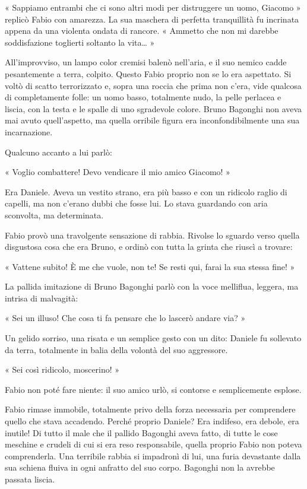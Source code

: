 « Sappiamo entrambi che ci sono altri modi per distruggere un uomo, Giacomo » replicò Fabio con amarezza. La sua maschera di perfetta tranquillità fu incrinata appena da una violenta ondata di rancore. « Ammetto che non mi darebbe soddisfazione toglierti soltanto la vita… »

All'improvviso, un lampo color cremisi balenò nell'aria, e il suo nemico cadde pesantemente a terra, colpito. Questo Fabio proprio non se lo era aspettato. Si voltò di scatto terrorizzato e, sopra una roccia che prima non c'era, vide qualcosa di completamente folle: un uomo basso, totalmente nudo, la pelle perlacea e liscia, con la testa e le spalle di uno sgradevole colore. Bruno Bagonghi non aveva mai avuto quell'aspetto, ma quella orribile figura era inconfondibilmente una sua incarnazione.

Qualcuno accanto a lui parlò:

« Voglio combattere! Devo vendicare il mio amico Giacomo! »

Era Daniele. Aveva un vestito strano, era più basso e con un ridicolo raglio di capelli, ma non c'erano dubbi che fosse lui. Lo stava guardando con aria sconvolta, ma determinata.

Fabio provò una travolgente sensazione di rabbia. Rivolse lo sguardo verso quella disgustosa cosa che era Bruno, e ordinò con tutta la grinta che riuscì a trovare:

« Vattene subito! È me che vuole, non te! Se resti qui, farai la sua stessa fine! »

La pallida imitazione di Bruno Bagonghi parlò con la voce melliflua, leggera, ma intrisa di malvagità:

« Sei un illuso! Che cosa ti fa pensare che lo lascerò andare via? »

Un gelido sorriso, una risata e un semplice gesto con un dito: Daniele fu sollevato da terra, totalmente in balia della volontà del suo aggressore.

« Sei così ridicolo, moscerino! »

Fabio non poté fare niente: il suo amico urlò, si contorse e semplicemente esplose.

Fabio rimase immobile, totalmente privo della forza necessaria per comprendere quello che stava accadendo. Perché proprio Daniele? Era indifeso, era debole, era inutile! Di tutto il male che il pallido Bagonghi aveva fatto, di tutte le cose meschine e crudeli di cui si era reso responsabile, quella proprio Fabio non poteva comprenderla. Una terribile rabbia si impadronì di lui, una furia devastante dalla sua schiena fluiva in ogni anfratto del suo corpo. Bagonghi non la avrebbe passata liscia.

